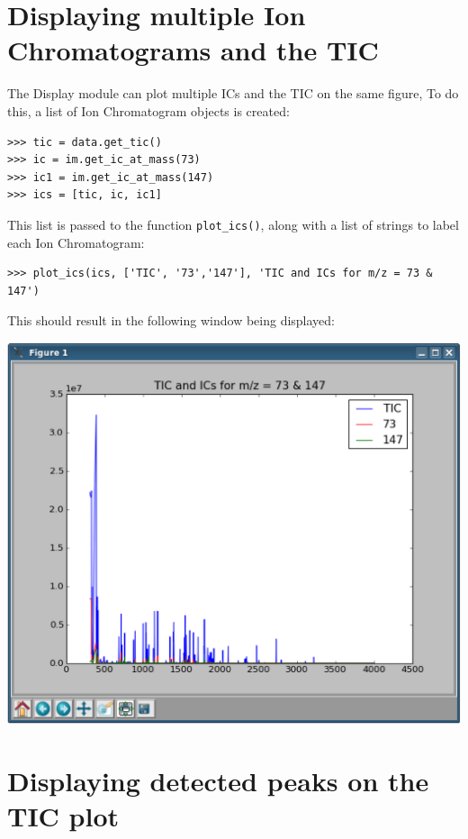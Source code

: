 \section{Displaying multiple Ion Chromatograms and the TIC}



The Display module can plot multiple ICs and the TIC on the same figure, 
To do this, a list of Ion Chromatogram objects is created:

\begin{verbatim}
>>> tic = data.get_tic()
>>> ic = im.get_ic_at_mass(73)
>>> ic1 = im.get_ic_at_mass(147)
>>> ics = [tic, ic, ic1]
\end{verbatim}

This list is passed to the 
function {\tt plot\_ics()}, along with a list of strings to label each 
Ion Chromatogram:

\begin{verbatim}
>>> plot_ics(ics, ['TIC', '73','147'], 'TIC and ICs for m/z = 73 & 147')
\end{verbatim}

This should result in the following window being displayed:

\begin{center}
\includegraphics[scale=0.33]{graphics/chapter07/test-70b.eps}
\end{center}


\section{Displaying detected peaks on the TIC plot}

